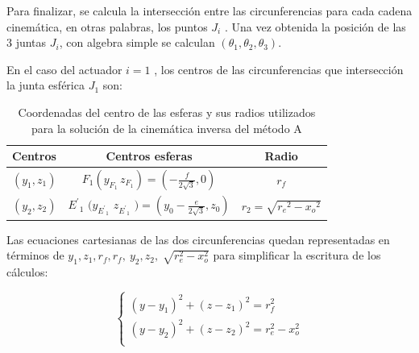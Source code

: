                 \newpage

        Para finalizar, se calcula la intersecci\'{o}n entre las circunferencias para cada cadena cinem\'{a}tica, en otras palabras, los puntos  $J_i$ . Una vez obtenida la posici\'{o}n de las 3 juntas $J_i$, con algebra simple se calculan $\left({\theta }_1,{\theta }_2,{\theta }_3\right)$.
        
        En el caso del actuador  $i=1$ , los centros de las circunferencias que intersección la junta esf\'{e}rica $J_1$ son:
        
        \begin{center}
        \renewcommand{\arraystretch}{2.5}
        
            \begin{table}[H]
            \centering
            \begin{tabular}{p{1.4cm} c c } 
                 \hline
                 \textbf{Centros}  &  \textbf{Centros esferas}  & \textbf{Radio} \\ [0.1ex] 
                 \hline\hline
                         $\left(y_1,z_1\right)$ &
                        $F_1\left(y_{F_1}\,z_{F_1}\right)=\left(-\frac{f}{2\sqrt{3}},0\right)$\textit{} & 
                                                 $r_f$  \\ 
                \hline
                          $(y_2,z_2)$&
                          ${E^'}_{1}$ $(y_{{E^'}_1}$ $z_{{E^'}_1}$ $)=(y_0-\frac{e}{2\sqrt{3}},z_0)$ &
                          $r_2=\sqrt{{r_e}^2-{x_o}^2}$ \\
                \hline
            \end{tabular}
            \caption{Coordenadas del centro de las esferas y sus radios utilizados para la solución de la cinemática inversa del método A}
            \label{tab:cap4_tabla_4}
            \end{table}
        \end{center}
    \vspace{-2.5em}
        
Las ecuaciones cartesianas de las dos circunferencias quedan representadas en términos de  $y_{1},z_{1},r_{f},r_{f},~y_{2},z_{2},\sqrt[]{r_{e}^{2}-x_{o}^{2}}$ para simplificar la escritura de los cálculos:

    \begin{equation}
    \left\lbrace
    \begin{array}{ll}
    \left( y-y_{1} \right) ^{2} + \left( z-z_{1} \right) ^{2}= r_{f}^{2}~\\
    \left( y-y_{2} \right) ^{2} + \left( z-z_{2} \right) ^{2}= r_{e}^{2}-x_{o}^{2}\\ 
    \end{array}
    \right.
    \label{eq:cap4_eq_15}
    \end{equation}

